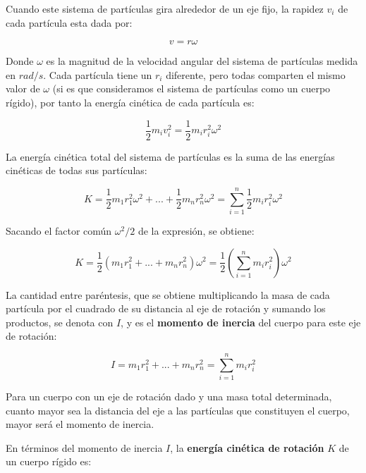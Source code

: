 \documentclass[letter,oneside,11pt]{article}
\begin{document}
Cuando este sistema de partículas gira alrededor de un eje fijo, la rapidez
$v_i$ de cada partícula esta dada por:

\begin{equation*}
    v = r \omega
\label{velocidad}
\end{equation*}

Donde $\omega$ es la magnitud de la velocidad angular del sistema de partículas
medida en $rad/s$. Cada partícula tiene un $r_i$ diferente, pero todas comparten
el mismo valor de $\omega$ (si es que consideramos el sistema de partículas como
un cuerpo rígido), por tanto la energía cinética de cada partícula es:

\begin{equation*}
    \frac{1}{2} m_i v^2_i = \frac{1}{2} m_i r^2_i \omega^2
\label{cinetica}
\end{equation*}

La energía cinética total del sistema de partículas es la suma de las energías
cinéticas de todas sus partículas:

\begin{equation*}
    K = \frac{1}{2} m_1 r^2_1 \omega^2 + ... + \frac{1}{2} m_n r^2_n \omega^2 = \sum_{i=1}^{n} \frac{1}{2} m_i r^2_i \omega^2
\label{cineticatotal1}
\end{equation*}

Sacando el factor común $\omega^2/2$ de la expresión, se obtiene:

\begin{equation*}
    K = \frac{1}{2} (m_1 r^2_1 + ... + m_n r^2_n ) \omega^2 = \frac{1}{2} \left( \sum_{i=1}^{n} m_i r^2_i \right) \omega^2
\label{cineticatotal2}
\end{equation*}

La cantidad entre paréntesis, que se obtiene multiplicando la masa de cada
partícula por el cuadrado de su distancia al eje de rotación y sumando los
productos, se denota con $I$, y es el \textbf{momento de inercia} del cuerpo
para este eje de rotación:

\begin{equation}
    I = m_1 r^2_1 + ... + m_n r^2_n = \sum_{i=1}^{n} m_i r^2_i
\label{momentodeinercia}
\end{equation}

Para un cuerpo con un eje de rotación dado y una masa total determinada, cuanto
mayor sea la distancia del eje a las partículas que constituyen el cuerpo, mayor
será el momento de inercia.

En términos del momento de inercia $I$, la \textbf{energía cinética de rotación}
$K$ de un cuerpo rígido es:
\end{document}
